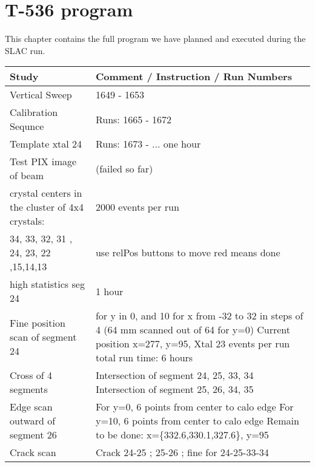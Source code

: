 \chapter{T-536 program}
\label{app:program}

This chapter contains the full program we have planned and executed during the SLAC run.

\begin{landscape}

\begin{longtable}{|p{8cm}|p{12cm}|} \hline
Study &  Comment / Instruction / Run Numbers \\ \hline
Vertical Sweep & 1649 - 1653 \\ \hline
Calibration Sequnce & Runs: 1665 - 1672 \\ \hline
Template xtal 24 & Runs: 1673 - ... one hour \\ \hline
Test PIX image of beam & (failed so far) \\ \hline
crystal centers in the \newline cluster of 4x4 crystals: & 2000 events per run \\ \hline
34, 33, 32, 31 \newline 25, 24, 23, 22 \newline 16,15,14,13 & use relPos buttons to move \newline red means done \\ \hline
high statistics seg 24 & 1 hour \\ \hline
Fine position scan of segment 24 & for y in 0, and 10 \newline for x from -32 to 32 in steps of 4  \newline (64 mm scanned out of 64 for y=0) \newline Current position x=277, y=95, Xtal 23 \newline 3000 events per run \newline total run time: 6 hours \\ \hline
Cross of 4 segments & Intersection of segment 24, 25, 33, 34  \newline Intersection of segment 25, 26, 34, 35 \\ \hline
Edge scan outward of segment 26 & For y=0, 6 points from center to calo edge \newline For y=10, 6 points from center to calo edge \newline Remain to be done: x=\{332.6,330.1,327.6\}, y=95 \\ \hline
Crack scan & Crack 24-25 ; 25-26 ; fine for 24-25-33-34 \\ \hline

\end{longtable}
\end{landscape}
